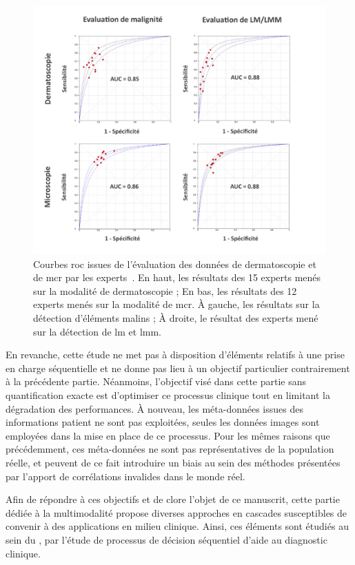 \begin{figure}[H]
    \begin{center}
        \includegraphics[width=\linewidth]{contents/iii_preamble_multimodal/resources/results_roc_experts.pdf}
        \caption{Courbes \gls{roc} issues de l'évaluation des données de dermatoscopie et de \gls{mcr} par les experts~\cite{Cinotti2018}. En haut, les résultats des 15 experts menés sur la modalité de dermatoscopie ; En bas, les résultats des 12 experts menés sur la modalité de \gls{mcr}. À gauche, les résultats sur la détection d'éléments malins ; À droite, le résultat des experts mené sur la détection de \gls{lm} et \gls{lmm}.}
        \label{fig:results_roc_experts}
    \end{center} 
\end{figure}\par

En revanche, cette étude ne met pas à disposition d'éléments relatifs à une prise en charge séquentielle et ne donne pas lieu à un objectif particulier contrairement à la précédente partie. Néanmoins, l'objectif visé dans cette partie sans quantification exacte est d'optimiser ce processus clinique tout en limitant la dégradation des performances. À nouveau, les méta-données issues des informations patient ne sont pas exploitées, seules les données images sont employées dans la mise en place de ce processus. Pour les mêmes raisons que précédemment, ces méta-données ne sont pas représentatives de la population réelle, et peuvent de ce fait introduire un biais au sein des méthodes présentées par l'apport de corrélations invalides dans le monde réel.\par

Afin de répondre à ces objectifs et de clore l'objet de ce manuscrit, cette partie dédiée à la multimodalité propose diverses approches en cascades susceptibles de convenir à des applications en milieu clinique. Ainsi, ces éléments sont étudiés au sein du , par l'étude de processus de décision séquentiel d'aide au diagnostic clinique.\par
